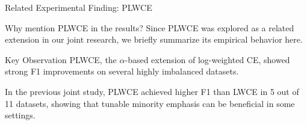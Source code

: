 \documentclass[aspectratio=169]{beamer}
\begin{document}

\begin{frame}{Related Experimental Finding: PLWCE}

\vspace{-0.4em} %

\begin{mybox}[before skip=0pt, after skip=0pt, top=2pt, bottom=2pt]{Why mention PLWCE in the results?} %
\small
Since PLWCE was explored as a related extension in our joint research,
we briefly summarize its empirical behavior here.
\end{mybox}

\vspace{2em} %

\begin{mybox}[before skip=0pt, after skip=0pt, top=2pt, bottom=2pt]{Key Observation} %
\small
PLWCE, the $\alpha$-based extension of log-weighted CE, showed
strong F1 improvements on several highly imbalanced datasets.

\vspace{0.4em}

In the previous joint study, PLWCE achieved higher F1 than LWCE
in 5 out of 11 datasets, showing that tunable minority emphasis
can be beneficial in some settings.
\end{mybox}

\end{frame}

\end{document}
